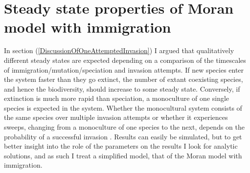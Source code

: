 \section{Steady state properties of Moran model with immigration}
In section (\ref{DiscussionOfOneAttemptedInvasion}) I argued that qualitatively different steady states are expected depending on a comparison of the timescales of immigration/mutation/speciation and invasion attempts. 
If new species enter the system faster than they go extinct, the number of extant coexisting species, and hence the biodiversity, should increase to some steady state. 
Conversely, if extinction is much more rapid than speciation, a monoculture of one single species is expected in the system. 
Whether the monocultural system consists of the same species over multiple invasion attempts or whether it experiences sweeps, changing from a monoculture of one species to the next, depends on the probability of a successful invasion \cite{Chesson1997,Chesson2000,Desai2007,Desai2007b}. 
Results can easily be simulated, but to get better insight into the role of the parameters on the results I look for analytic solutions, and as such I treat a simplified model, that of the Moran model with immigration. 

